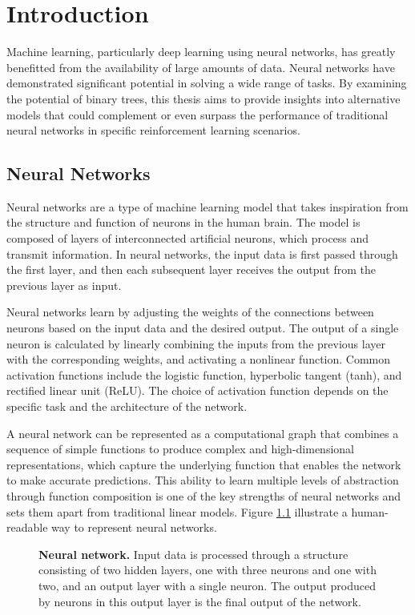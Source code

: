 
\chapter{Introduction}
\label{ch:introduction}
Machine learning, particularly deep learning using neural networks, has greatly benefitted from the availability of large amounts of data. Neural networks have demonstrated significant potential in solving a wide range of tasks. By examining the potential of binary trees, this thesis aims to provide insights into alternative models that could complement or even surpass the performance of traditional neural networks in specific reinforcement learning scenarios.

\section{Neural Networks}

Neural networks are a type of machine learning model that takes inspiration from the structure and function of neurons in the human brain. The model is composed of layers of interconnected artificial neurons, which process and transmit information. In neural networks, the input data is first passed through the first layer, and then each subsequent layer receives the output from the previous layer as input.

Neural networks learn by adjusting the weights of the connections between neurons based on the input data and the desired output. The output of a single neuron is calculated by linearly combining the inputs from the previous layer with the corresponding weights, and activating a nonlinear function. Common activation functions include the logistic function, hyperbolic tangent (tanh), and rectified linear unit (ReLU). The choice of activation function depends on the specific task and the architecture of the network.

A neural network can be represented as a computational graph that combines a sequence of simple functions to produce complex and high-dimensional representations, which capture the underlying function that enables the network to make accurate predictions. This ability to learn multiple levels of abstraction through function composition is one of the key strengths of neural networks and sets them apart from traditional linear models. Figure \ref{fig:neural_network} illustrate a human-readable way to represent neural networks.

\begin{figure}[!ht]
\centering
{}
\caption[Neural network representation]{
  \textbf{Neural network.} Input data is processed through a structure consisting of two hidden layers, one with three neurons and one with two, and an output layer with a single neuron. The output produced by neurons in this output layer is the final output of the network.
  }
\label{fig:neural_network}
\end{figure}


